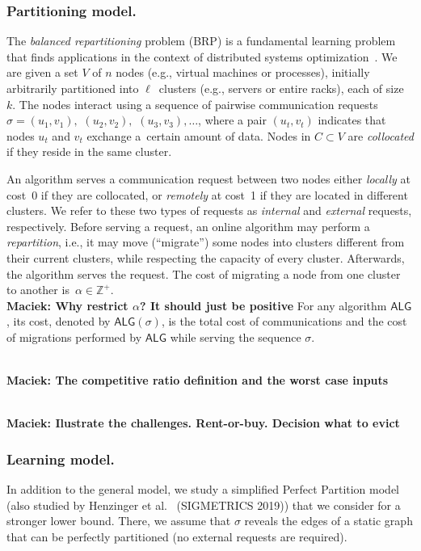 \documentclass[manuscript,screen=true, review, anonymous]{acmart}
\newcommand{\ALG}{\textsf{ALG}\xspace}
\newcommand{\OBRP}{BRP}
\newcommand\maciek[1]{\color{brown}\textbf{\\ Maciek: #1}\color{black}}
\begin{document}
\subsubsection{Partitioning model.}
The \emph{balanced repartitioning} problem (\OBRP{})
is a fundamental learning problem
that finds applications in the context of
distributed systems optimization~\cite{repartition-disc}. We are given a set $V$ of $n$ nodes 
(e.g., virtual machines or processes),
initially arbitrarily partitioned into $\ell$~clusters
(e.g., servers or entire racks),
each of size~$k$.
The nodes interact using
a sequence of pairwise communication requests
$\sigma = (u_1,v_1),$ $(u_2,v_2),$ $(u_3,v_3), \ldots$,
where a pair $(u_t,v_t)$ indicates that nodes $u_t$ and $v_t$ exchange a~certain amount of data.
Nodes in $C \subset V$ are \emph{collocated}
if they reside in the same cluster.

An algorithm serves a communication request between two nodes
either \emph{locally} at cost~0
if they are collocated,
or \emph{remotely} at cost~1
if they are located in different clusters.
We refer to these two types of requests as \emph{internal}
and \emph{external} requests, respectively.
Before serving a request,
an online algorithm may perform a \emph{repartition},
i.e.,
it may move (``migrate'') some nodes into clusters different from their current clusters, while respecting the capacity of every cluster. 
Afterwards, 
the algorithm serves the  request.
The cost of migrating a node from one cluster to another
is~$\alpha \in \mathbb{Z}^+$.
\maciek{Why restrict $\alpha$? It should just be positive}
For any algorithm $\ALG$,
its cost,
denoted by $\ALG(\sigma)$,
is the total cost of communications and
the cost of migrations performed by $\ALG$ while serving the sequence $\sigma$.

\maciek{The competitive ratio definition and the worst case inputs}

\maciek{Ilustrate the challenges. Rent-or-buy. Decision what to evict}


\subsubsection{Learning model.}
In addition to the general model, we study a simplified Perfect Partition model (also studied by Henzinger et al.~\cite{sigmetrics19_partitioning} (SIGMETRICS 2019)) that we consider for a stronger lower bound.
There, we assume that $\sigma$
reveals the edges of a static graph
that can be perfectly partitioned
(no external requests are required). 
\end{document}
